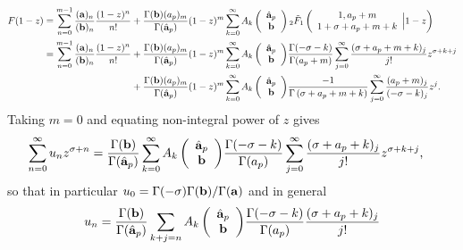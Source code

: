 \documentclass[10pt]{article}
\numberwithin{equation}{section}
\begin{document}
\begin{align*}
F(1-z)=\sum_{n=0}^{m-1} \frac{(\bold a)_n}{(\bold b)_n}\frac{(1-z)^n}{n!}&+\frac{\Gamma(\bold{b})(a_p)_m}{\Gamma(\hat{\bold{a}}_p)} (1-z)^m \sum_{k=0}^{\infty} {A_k\left(\begin{array}{c} \hat{\bold{a}}_p \\ \bold{b} \end{array}\right)}\,{} _2\tilde{F}_1\left( \begin{array}{c} 1,a_p+m \\ 1+\sigma+a_p+m+k \end{array} \Big| 1-z\right)\\
=\sum_{n=0}^{m-1} \frac{(\bold a)_n}{(\bold b)_n}\frac{(1-z)^n}{n!}&+\frac{\Gamma(\bold{b})(a_p)_m}{\Gamma(\hat{\bold{a}}_p)} (1-z)^m \sum_{k=0}^{\infty} {A_k\left(\begin{array}{c} \hat{\bold{a}}_p \\ \bold{b} \end{array}\right)}\frac{\Gamma (-\sigma-k)}{\Gamma (a_p+m)} \sum_{j=0}^{\infty} \frac{(\sigma+a_p+m+k)_j}{j!}z^{\sigma+k+j}\\
&+\frac{\Gamma(\bold{b})(a_p)_m}{\Gamma(\hat{\bold{a}}_p)} (1-z)^m \sum_{k=0}^{\infty} {A_k\left(\begin{array}{c} \hat{\bold{a}}_p \\ \bold{b} \end{array}\right)} \frac{-1}{\Gamma
	\left(\sigma+a_p+m+k\right)} \sum_{j=0}^{\infty} \frac{(a_p+m)_j}{(-\sigma-k)_j} z^j.
\end{align*}
Taking $m=0$ and equating non-integral power of $z$ gives
\begin{align*}
\sum_{n=0}^\infty u_n z^{\sigma + n} &= \frac{\Gamma(\bold{b})}{\Gamma(\hat{\bold{a}}_p)} \sum_{k=0}^{\infty} {A_k\left(\begin{array}{c} \hat{\bold{a}}_p \\ \bold{b} \end{array}\right)}\frac{\Gamma (-\sigma-k)}{\Gamma (a_p)} \sum_{j=0}^\infty \frac{(\sigma+a_p+k)_j}{j!} z^{\sigma+k+j}\text{,}
\end{align*}
so that in particular $u_0=\Gamma(-\sigma)\Gamma(\bold b) / \Gamma (\bold a)$ and in general
\begin{align*}
u_n=\frac{\Gamma(\bold{b})}{\Gamma(\hat{\bold{a}}_p)} \sum_{k+j=n}{A_k\left(\begin{array}{c} \hat{\bold{a}}_p \\ \bold{b} \end{array}\right)}\frac{\Gamma (-\sigma-k)}{\Gamma (a_p)} \frac{(\sigma+a_p+k)_j}{j!}
\end{align*}
\end{document}
